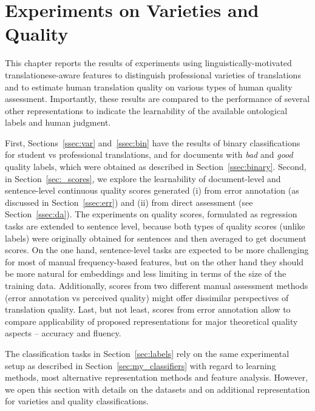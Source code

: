 \chapter{\label{cha:pro_qua}Experiments on Varieties and Quality}
This chapter reports the results of experiments using linguistically-motivated translationese-aware features to distinguish professional varieties of translations and to estimate human translation quality on various types of human quality assessment. Importantly, these results are compared to the performance of several other representations to indicate the learnability of the available ontological labels and human judgment. 


First, Sections~\ref{ssec:var} and~\ref{ssec:bin} have the results of binary classifications for student vs professional translations, and for documents with \textit{bad} and \textit{good} quality labels, which were obtained as described in Section~\ref{ssec:binary}. 
Second, in Section~\ref{sec:_scores}, we explore the learnability of document-level and sentence-level continuous quality scores generated (i) from  error annotation (as discussed in Section~\ref{ssec:err}) and (ii) from direct assessment (see Section~\ref{ssec:da}). The experiments on quality scores, formulated as regression tasks are extended to sentence level, because both types of quality scores (unlike labels) were originally obtained for sentences and then averaged to get document scores. 
On the one hand, sentence-level tasks are expected to be more challenging for most of manual frequency-based features, but on the other hand they should be more natural for embeddings and less limiting in terms of the size of the training data. Additionally, scores from two different manual assessment methods (error annotation vs perceived quality) might offer dissimilar perspectives of translation quality.
Last, but not least, scores from error annotation allow to compare applicability of proposed representations for major theoretical quality aspects -- accuracy and fluency.

The classification tasks in Section~\ref{sec:labels} rely on the same experimental setup as described in Section~\ref{sec:my_classifiers} with regard to learning methods, most alternative representation methods and feature analysis. However, we open this section with details on the datasets and on additional representation for varieties and quality classifications.
 
